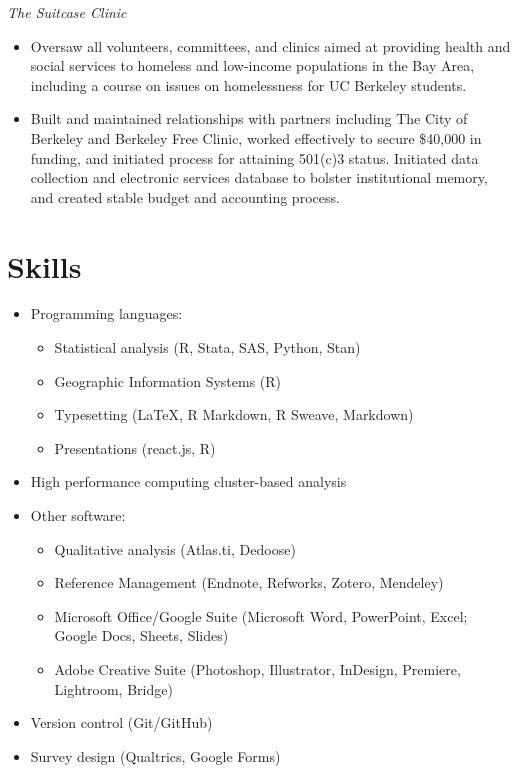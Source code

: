 \documentclass{cv_style}
\begin{document}
\textit{The Suitcase Clinic}
\begin{itemize}
    \item Oversaw all volunteers, committees, and clinics aimed at providing health and social services to homeless and low-income populations in the Bay Area, including a course on issues on homelessness for UC Berkeley  students. 
    \item \parskip 1pt Built and maintained relationships with partners including The City of Berkeley and Berkeley Free Clinic, worked effectively to secure \$40,000 in funding, and initiated process for attaining 501(c)3 status. Initiated data collection and electronic services database to bolster institutional memory, and created stable budget and accounting process.
\end{itemize}


\section{Skills}
\begin{itemize}
    \item Programming languages: 
    \begin{itemize}
        \item Statistical analysis (R, Stata, SAS, Python, Stan)
        \item \parskip 1pt Geographic Information Systems (R)
        \item \parskip 1pt Typesetting (\LaTeX, R Markdown, R Sweave, Markdown) 
        \item \parskip 1pt Presentations (react.js, R) 
    \end{itemize}
    \item \parskip 1pt High performance computing cluster-based analysis
    \item \parskip 1pt Other software: 
    \begin{itemize}
        \item \parskip 1pt Qualitative analysis (Atlas.ti, Dedoose)
        \item \parskip 1pt Reference Management (Endnote, Refworks, Zotero, Mendeley)
        \item \parskip 1pt Microsoft Office/Google Suite (Microsoft Word, PowerPoint, Excel; Google Docs, Sheets, Slides)
        \item \parskip 1pt Adobe Creative Suite (Photoshop, Illustrator, InDesign, Premiere, Lightroom, Bridge)
    \end{itemize}
    \item \parskip 1pt Version control (Git/GitHub)
    \item \parskip 1pt Survey design (Qualtrics, Google Forms)
\end{itemize}
\end{document}
